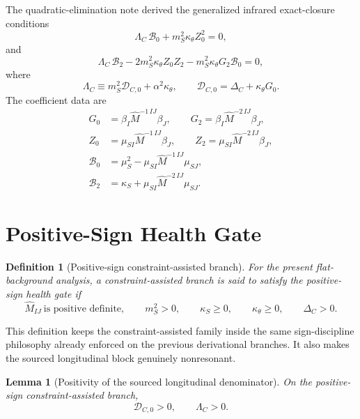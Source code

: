 \documentclass[11pt]{article}
\newtheorem{definition}{Definition}
\newtheorem{lemma}{Lemma}
\begin{document}
The quadratic-elimination note derived the generalized infrared exact-closure conditions
\begin{equation}
\Lambda_C\,\mathcal B_0
+m_S^2\kappa_\theta Z_0^2
=
0,
\label{eq:gencond0}
\end{equation}
and
\begin{equation}
\Lambda_C\,\mathcal B_2
-2m_S^2\kappa_\theta Z_0Z_2
-m_S^2\kappa_\theta G_2\mathcal B_0
=
0,
\label{eq:gencond2}
\end{equation}
where
\begin{equation}
\Lambda_C
\equiv
m_S^2\mathcal D_{C,0}+\alpha^2\kappa_\theta,
\qquad
\mathcal D_{C,0}
=
\Delta_C+\kappa_\theta G_0.
\label{eq:LambdaC}
\end{equation}
The coefficient data are
\begin{align}
G_0
&=
\beta_I\widehat M^{-1\,IJ}\beta_J,
\qquad
G_2
=
\beta_I\widehat M^{-2\,IJ}\beta_J,
\label{eq:Gcoeffs}
\\
Z_0
&=
\mu_{SI}\widehat M^{-1\,IJ}\beta_J,
\qquad
Z_2
=
\mu_{SI}\widehat M^{-2\,IJ}\beta_J,
\label{eq:Zcoeffs}
\\
\mathcal B_0
&=
\mu_S^2-\mu_{SI}\widehat M^{-1\,IJ}\mu_{SJ},
\label{eq:B0}
\\
\mathcal B_2
&=
\kappa_S+\mu_{SI}\widehat M^{-2\,IJ}\mu_{SJ}.
\label{eq:B2}
\end{align}

\section{Positive-Sign Health Gate}

\begin{definition}[Positive-sign constraint-assisted branch]
For the present flat-background analysis, a constraint-assisted branch is said to satisfy the positive-sign health gate if
\begin{equation}
\widehat M_{IJ}\ \text{is positive definite},
\qquad
m_S^2>0,
\qquad
\kappa_S\ge 0,
\qquad
\kappa_\theta\ge 0,
\qquad
\Delta_C>0.
\label{eq:positivebranch}
\end{equation}
\end{definition}

This definition keeps the constraint-assisted family inside the same sign-discipline philosophy already enforced on the previous derivational branches. It also makes the sourced longitudinal block genuinely nonresonant.

\begin{lemma}[Positivity of the sourced longitudinal denominator]
On the positive-sign constraint-assisted branch,
\begin{equation}
\mathcal D_{C,0}>0,
\qquad
\Lambda_C>0.
\label{eq:LambdaPositive}
\end{equation}
\end{lemma}
\end{document}
